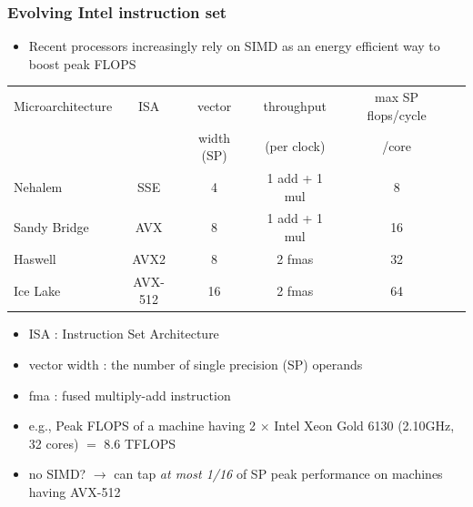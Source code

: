 \documentclass[12pt,dvipdfmx]{beamer}
\newcommand{\ao}[1]{{\color{blue}#1}}
\begin{document}
\begin{frame}
\frametitle{Evolving Intel instruction set}

\begin{itemize}
\item Recent processors increasingly rely on SIMD
  as an energy efficient way to boost peak FLOPS
\end{itemize}

\begin{center}
{\scriptsize
\begin{tabular}{|l|c|c|c|c|c|}\hline
Microarchitecture & ISA    & vector        & throughput & max SP flops/cycle \\
                  &        & width (SP)    & (per clock)  & /core          \\
\hline
Nehalem           & SSE     & 4 & 1 add + 1 mul      & 8  \\
Sandy Bridge      & AVX     & 8 & 1 add + 1 mul     & 16 \\
Haswell           & AVX2    & 8 & 2 fmas             & 32 \\
\ao{Ice Lake}     & \ao{AVX-512} & \ao{16}  & \ao{2 fmas} & \ao{64} \\
\hline
\end{tabular}
}
\end{center}

\begin{itemize}
\item ISA : Instruction Set Architecture
\item vector width : the number of single precision (SP) operands 
\item fma : fused multiply-add instruction
\item e.g.,
  Peak FLOPS of a machine having 2 $\times$ Intel Xeon Gold 6130 (2.10GHz, 32 cores) $=$ 8.6 TFLOPS
\item no SIMD? $\rightarrow$ can tap {\it at most 1/16} of SP peak performance on machines having AVX-512
\end{itemize}
\end{frame}
\end{document}
